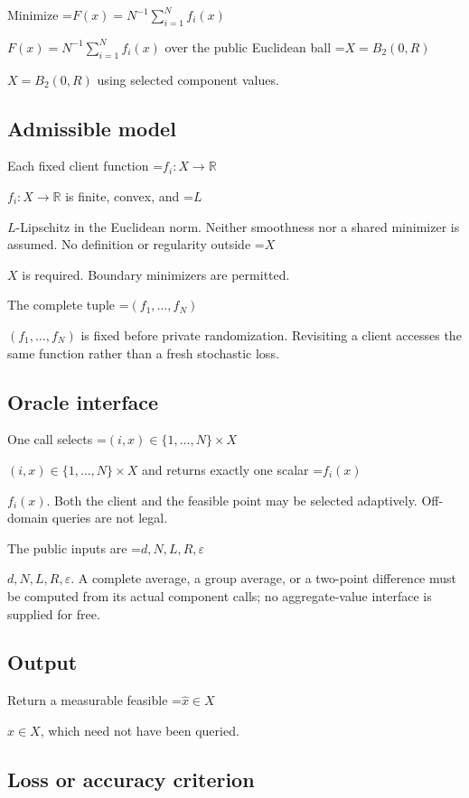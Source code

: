 \documentclass[10pt,a4paper]{article}
\newcommand{\AtlasMath}[1]{\par\begingroup\centering\setbox0=\hbox{$\displaystyle #1$}\ifdim\wd0>1.4\linewidth\typeout{ATLAS WIDE FORMULA: \the\wd0}\fi\ifdim\wd0>\linewidth\resizebox{\linewidth}{!}{\box0}\else\box0\fi\par\endgroup}
\newcommand{\AtlasInlineMath}[1]{\begingroup\setbox0=\hbox{$#1$}\ifdim\wd0>.4\linewidth\endgroup\AtlasMath{#1}\else\endgroup$#1$\fi}
\begin{document}
Minimize \AtlasInlineMath{F(x)=N^{-1}\sum_{i=1}^N f_i(x)} over the public Euclidean ball \AtlasInlineMath{X=B_2(0,R)} using selected component values.



\subsection{Admissible model}


Each fixed client function \AtlasInlineMath{f_i:X\to\mathbb R} is finite, convex, and \AtlasInlineMath{L}-Lipschitz in the Euclidean norm. Neither smoothness nor a shared minimizer is assumed. No definition or regularity outside \AtlasInlineMath{X} is required. Boundary minimizers are permitted.



The complete tuple \AtlasInlineMath{(f_1,\ldots,f_N)} is fixed before private randomization. Revisiting a client accesses the same function rather than a fresh stochastic loss.



\subsection{Oracle interface}


One call selects \AtlasInlineMath{(i,x)\in\{1,\ldots,N\}\times X} and returns exactly one scalar \AtlasInlineMath{f_i(x)}. Both the client and the feasible point may be selected adaptively. Off-domain queries are not legal.



The public inputs are \AtlasInlineMath{d,N,L,R,\varepsilon}. A complete average, a group average, or a two-point difference must be computed from its actual component calls; no aggregate-value interface is supplied for free.



\subsection{Output}


Return a measurable feasible \AtlasInlineMath{\widehat x\in X}, which need not have been queried.



\subsection{Loss or accuracy criterion}
\end{document}
